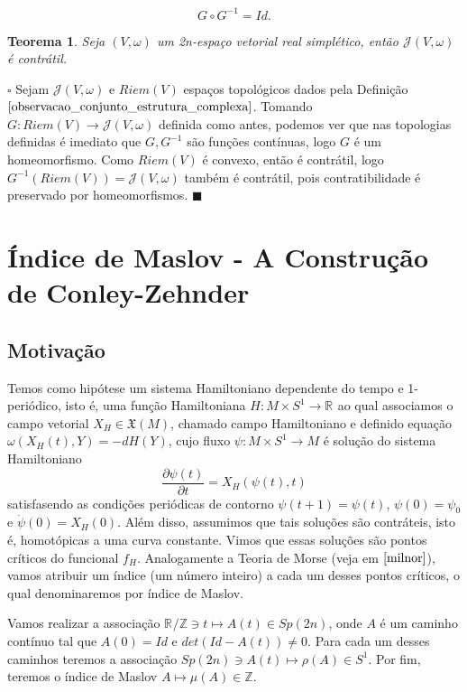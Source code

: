 \documentclass[12pt]{book}
\newtheorem{teorema}{Teorema}[section]
\newenvironment{prova}[1]{$\square$ #1}{\hfill$\blacksquare$}
\newcommand{\campohamiltoniano}[1]{X_{H}(#1)}
\newcommand{\campossuaves}[1]{\mathfrak{X}(#1)}
\newcommand{\circulo}{S^{1}}
\newcommand{\derivadaparcial}[2]{\frac{\partial #1}{\partial #2}}
\newcommand{\estruturascomplexaspadrao}{\mathcal{J}(V, \omega)}
\newcommand{\formaSimpletica}[2]{\omega(#1, #2)}
\newcommand{\gruposimpletico}[1]{Sp(#1)}
\newcommand{\inteiros}{\mathbb{Z}}
\newcommand{\produtosinternos}[1]{Riem(#1)}
\newcommand{\real}[1]{\mathbb{R}^{#1}}
\newcommand{\reta}{\real{}}
\newcommand{\vermelho}[1]{{\color{red}#1}}
\begin{document}
	$$
	G\circ G^{-1} = Id.
	$$
	
	\begin{teorema}
		Seja $(V,\omega)$ um 2n-espaço vetorial real simplético, então $\estruturascomplexaspadrao$ é contrátil.
	\end{teorema}
	\begin{prova}
		Sejam $\estruturascomplexaspadrao$ e $\produtosinternos{V}$ espaços topológicos dados pela Definição $\ref{observacao_conjunto_estrutura_complexa}$. Tomando $G:\produtosinternos{V} \to \estruturascomplexaspadrao$ definida como antes, \vermelho{podemos ver que nas topologias definidas é imediato que $G, G^{-1}$ são funções contínuas}, logo $G$ é um homeomorfismo. Como $\produtosinternos{V}$ é convexo, então é contrátil, logo $G^{-1}(\produtosinternos{V}) = \estruturascomplexaspadrao$ também é contrátil, pois contratibilidade é preservado por homeomorfismos.
	\end{prova}			
	
	\chapter{Índice de Maslov - A Construção de Conley-Zehnder}
	\section{Motivação}
	Temos como hipótese um sistema Hamiltoniano dependente do tempo e 1-periódico, isto é, uma função Hamiltoniana $H:M\times \circulo \to \reta$ ao qual associamos o campo vetorial $X_{H} \in \campossuaves{M}$, chamado campo Hamiltoniano e definido equação $\formaSimpletica{\campohamiltoniano{t}}{Y} = -dH(Y)$, cujo fluxo $\psi:M\times \circulo \to M$ é solução do sistema Hamiltoniano
	$$
	\derivadaparcial{\psi(t)}{t} = X_{H}(\psi(t), t)
	$$
	satisfasendo as condições periódicas de contorno $\psi(t+1) = \psi(t)$, $\psi(0) = \psi_{0}$ e $\dot{\psi}(0) = \campohamiltoniano{0}$. Além disso, assumimos que tais soluções são contráteis, isto é, homotópicas a uma curva constante. Vimos que essas soluções são pontos críticos do funcional $f_{H}$. Analogamente a Teoria de Morse (veja em $\cite{milnor}$), vamos atribuir um índice (um número inteiro) a cada um desses pontos críticos, o qual denominaremos por índice de Maslov.

	Vamos realizar a associação $\reta/\mathbb{Z} \ni t \mapsto A(t) \in \gruposimpletico{2n}$, onde $A$ é um caminho contínuo tal que $A(0) = Id$ e $det(Id - A(t))\neq 0$. Para cada um desses caminhos teremos a associação $\gruposimpletico{2n} \ni A(t) \mapsto \rho(A) \in \circulo$. Por fim, teremos o índice de Maslov $A \mapsto \mu(A) \in \inteiros$.
	
\end{document}
